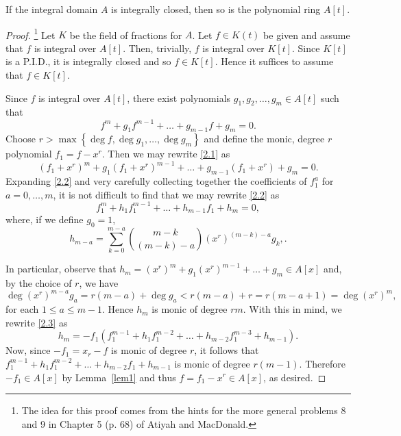 \documentclass[10pt]{amsart}
\begin{document}
\begin{thm}
  If the integral domain $A$ is integrally closed, then so is the polynomial ring $A[t]$.
  \begin{proof}\footnote{The idea for this proof comes from the hints for the more general problems 8 and 9 in Chapter 5 (p. 68) of Atiyah and MacDonald.}
    Let $K$ be the field of fractions for $A$.
    Let $f \in K(t)$ be given and assume that $f$ is integral over $A[t]$.
    Then, trivially, $f$ is integral over $K[t]$.
    Since $K[t]$ is a P.I.D., it is integrally closed and so $f \in K[t]$.
    Hence it suffices to assume that $f \in K[t]$.
    
    Since $f$ is integral over $A[t]$, there exist polynomials $g_1, g_2, \ldots, g_m \in A[t]$ such that
    \begin{equation}\label{2.1}
      f^m + g_1f^{m-1} + \ldots + g_{m-1}f + g_m = 0.
    \end{equation}
    Choose $r > \max\left\{ \deg{f}, \deg{g_1}, \ldots, \deg{g_m}\right\}$ and define the monic, degree $r$ polynomial $f_1 = f - x^r$.
    Then we may rewrite \eqref{2.1} as 
    \begin{equation}\label{2.2}
      (f_1 + x^r)^m + g_1(f_1 + x^r)^{m-1} + \ldots + g_{m-1}(f_1 + x^r) + g_m = 0.
    \end{equation}
    Expanding \eqref{2.2} and very carefully collecting together the coefficients of $f_1^a$ for $a = 0, \ldots, m$, it is not difficult to find that we may rewrite \eqref{2.2} as
    \begin{equation}\label{2.3}
      f_1^m + h_1f_1^{m-1} + \ldots + h_{m-1}f_1 + h_m = 0,
    \end{equation}
    where, if we define $g_0 = 1$,
    $$h_{m-a} = \sum_{k = 0}^{m-a} {{m - k}\choose{(m-k) - a}}\left(x^r\right)^{(m-k) - a}g_k,.$$

    In particular, observe that $h_m = (x^r)^m + g_1(x^r)^{m-1} + \ldots + g_m \in A[x]$ and, by the choice of $r$, we have 
    $$\deg{(x^r)^{m-a}g_{a}} = r(m-a) + \deg{g_{a}} < r(m - a) + r = r(m - a + 1) = \deg{(x^r)^m},$$
    for each $1 \leq a \leq m-1$.
    Hence $h_m$ is monic of degree $rm$.
    With this in mind, we rewrite \eqref{2.3} as
    $$h_m = -f_1\left(f_1^{m-1} + h_1f_1^{m-2} + \ldots + h_{m-2}f_1^{m-3} + h_{m-1}\right).$$
    Now, since $-f_1 = x_r - f$ is monic of degree $r$, it follows that $f_1^{m-1} + h_1f_1^{m-2} + \ldots + h_{m-2}f_1 + h_{m-1}$ is monic of degree $r(m-1)$.
    Therefore $-f_1 \in A[x]$ by Lemma~\ref{lem1} and thus $f = f_1 - x^r \in A[x]$, as desired.
  \end{proof}
\end{thm}
\end{document}
